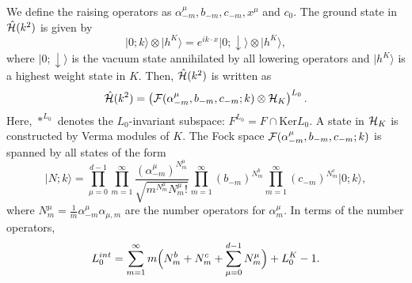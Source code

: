 \documentclass[a4paper,12pt]{article}
\newcommand{\ket}[1]{\mbox{$| #1 \rangle$}}
\begin{document}
We define the raising operators as $\alpha^{\mu}_{-m}, b_{-m}, c_{-m},
x^{\mu}$ and $c_0$. The ground state in $\hat{\cal H}(k^2)$ is given by 
\begin{equation}
%
\ket{0;k} \otimes \ket{h^K} 
= e^{ik \cdot x} \ket{0;\downarrow} \otimes \ket{h^K},
%
\end{equation}
where $\ket{0;\downarrow}$ is the vacuum state annihilated by all lowering
operators and $\ket{h^K}$ is a highest weight state in $K$. Then, $ \hat{\cal H}(k^2) $ is written as
\begin{equation}
%
\hat{\cal H}(k^2) =
\left(
{\cal F}(\alpha^{\mu}_{-m}, b_{-m}, c_{-m};k) \otimes {\cal H}_{K}
\right)^{L_0}.
%
\end{equation}
Here, $*^{L_0}$ denotes the $L_0$-invariant subspace:
$ F^{L_0}= F \cap \mbox{Ker} L_0$.
A state in ${\cal H}_{K}$ is constructed by Verma modules of $K$.
The Fock space ${\cal F}(\alpha^{\mu}_{-m}, b_{-m}, c_{-m};k)$ is spanned by all states of the form
\begin{equation}
%
\ket{N;k} =
\prod_{\mu=0}^{d-1} \prod_{m=1}^{\infty}
\frac{(\alpha^{\mu}_{-m})^{N_{m}^{\mu}}}{\sqrt{m^{N_{m}^{\mu}} N_{m}^{\mu}!}}
\prod_{m=1}^{\infty} (b_{-m})^{N_{m}^{b}}
\prod_{m=1}^{\infty} (c_{-m})^{N_{m}^{c}} \ket{0;k},
\label{eq:general_state}
%
\end{equation}
where 
$ N_{m}^{\mu} = \frac{1}{m} \alpha^{\mu}_{-m} \alpha_{\mu,m} $ 
are the number operators for $ \alpha^{\mu}_{m} $.
In terms of the number operators,
\begin{equation}
%
L_{0}^{int}
= \sum_{m=1}^{\infty} m \Bigl( N_{m}^{b} + N_{m}^{c}
+ \sum_{\mu=0}^{d-1} N_{m}^{\mu} \Bigr) + L_{0}^{K} -1.
\label{eq:L0int}
%
\end{equation}
\end{document}
